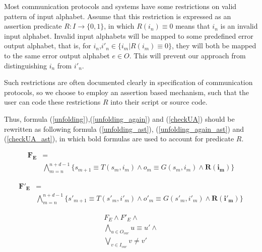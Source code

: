 \documentclass[journal]{IEEEtran}
\begin{document}
Most communication protocols and systems have some restrictions on valid pattern of input alphabet.
Assume that this restriction is expressed as an assertion predicate $R: I\to \{0,1\}$,
in which $R(i_{n})\equiv 0$ means that $i_n$ is an invalid input alphabet.
Invalid input alphabets will be mapped to some predefined error output alphabet,
that is,
for $i_n$,$i'_n\in \{i_m|R(i_m)\equiv 0\}$,
they will both be mapped to the same error output alphabet $e\in O$.
This will prevent our approach from distinguishing $i_n$ from $i'_n$.

Such restrictions are often documented clearly in specification of communication protocols,
so we choose to employ an assertion based mechanism,
such that the user can code these restrictions $R$ into their script or source code.

Thus, formula (\ref{unfolding}),(\ref{unfolding_again}) and (\ref{checkUA}) should be rewritten as following formula (\ref{unfolding_ast}), (\ref{unfolding_again_ast}) and (\ref{checkUA_ast}),
in which bold formulas are used to account for predicate $R$.

\begin{equation}\label{unfolding_ast}
\begin{split}
\boldsymbol{F_E} &= \\
&
\bigwedge_{m=n}^{n+d-1}
\Big\{
s_{m+1}\equiv T(s_m,i_m) \wedge
o_m\equiv G(s_m,i_m) \wedge
\boldsymbol{R (i_m)}
\Big\}
\end{split}
\end{equation}

\begin{equation}\label{unfolding_again_ast}
\begin{split}
\boldsymbol{F'_E} &= \\
&
\bigwedge_{m=n}^{n+d-1}
\Big\{
s'_{m+1}\equiv T(s'_m,i'_m) \wedge
o'_m\equiv G(s'_m,i'_m) \wedge
\boldsymbol{R (i'_m)}
\Big\}
\end{split}
\end{equation}

\begin{equation}\label{checkUA_ast}
\begin{array}{c}
F_E\wedge F'_E \wedge \\
\bigwedge_{u\in O_{var}} u\equiv u'\wedge \\
\bigvee_{v\in I_{var}} v\ne v'
\end{array}
\end{equation}
\end{document}
